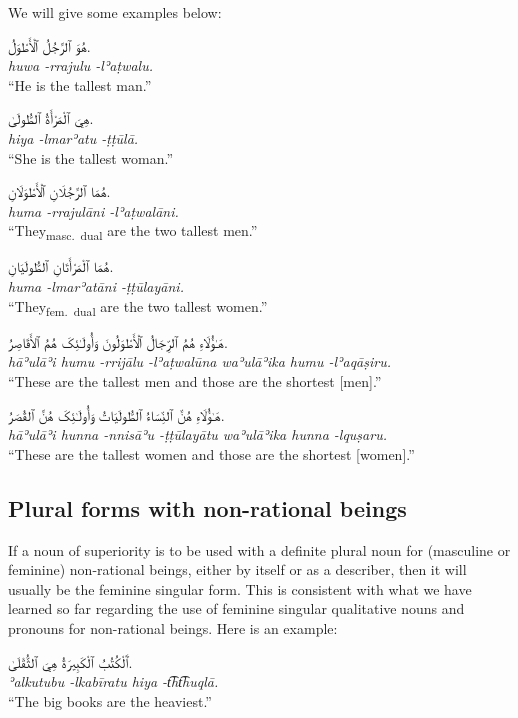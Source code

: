 \documentclass[
  10pt,
]{book}
\begin{document}
We will give some examples below:

\foreignlanguage{arabic}{هُوَ ٱلرَّجُلُ ٱلْأَطْوَلُ.}\\
\emph{huwa -rrajulu -lʾaṭwalu.}\\
\enquote{He is the tallest man.}

\foreignlanguage{arabic}{هِيَ ٱلْمَرْأَةُ ٱلطُّولَىٰ.}\\
\emph{hiya -lmarʾatu -ṭṭūlā.}\\
\enquote{She is the tallest woman.}

\foreignlanguage{arabic}{هُمَا ٱلرَّجُلَانِ ٱلْأَطْوَلَانِ.}\\
\emph{huma -rrajulāni -lʾaṭwalāni.}\\
\enquote{They\textsubscript{masc.~dual} are the two tallest men.}

\foreignlanguage{arabic}{هُمَا ٱلْمَرْأَتَانِ ٱلطُّولَيَانِ.}\\
\emph{huma -lmarʾatāni -ṭṭūlayāni.}\\
\enquote{They\textsubscript{fem.~dual} are the two tallest women.}

\foreignlanguage{arabic}{هَـٰؤُلَاءِ هُمُ ٱلرِّجَالُ ٱلْأَطْوَلُونَ وَأُولَـٰئِکَ هُمُ ٱلأَقَاصِرُ.}\\
\emph{hāʾulāʾi humu -rrijālu -lʾaṭwalūna waʾulāʾika humu -lʾaqāṣiru.}\\
\enquote{These are the tallest men and those are the shortest {[}men{]}.}

\foreignlanguage{arabic}{هَـٰؤُلَاءِ هُنَّ ٱلنِّسَاءُ ٱلطُّولَيَاتُ وَأُولَـٰئِکَ هُنَّ ٱلقُصَرُ.}\\
\emph{hāʾulāʾi hunna -nnisāʾu -ṭṭūlayātu waʾulāʾika hunna -lquṣaru.}\\
\enquote{These are the tallest women and those are the shortest {[}women{]}.}

\subsection{Plural forms with non-rational beings}\label{plural-forms-with-non-rational-beings}

If a noun of superiority is to be used with a definite plural noun for (masculine or feminine) non-rational beings, either by itself or as a describer, then it will usually be the feminine singular form. This is consistent with what we have learned so far regarding the use of feminine singular qualitative nouns and pronouns for non-rational beings. Here is an example:

\foreignlanguage{arabic}{ٱَلْکُتُبُ ٱلْکَبِيرَةُ هِيَ ٱلثُّقْلَىٰ.}\\
\emph{ʾalkutubu -lkabīratu hiya -t͡ht͡huqlā.}\\
\enquote{The big books are the heaviest.}
\end{document}
